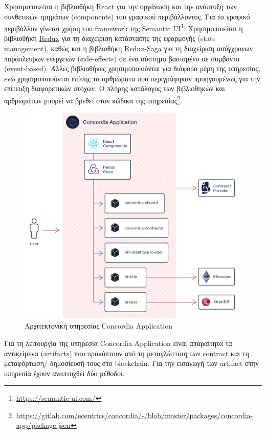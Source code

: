 Χρησιμοποιείται η βιβλιοθήκη \hyperref[subsection:4-2-2-1-react]{React} για την οργάνωση και την ανάπτυξη των συνθετικών τμημάτων (components) του γραφικού περιβάλλοντος. Για το γραφικό περιβάλλον γίνεται χρήση του framework της Semantic UI\footnote{\url{https://semantic-ui.com/}}. Χρησιμοποιείται η βιβλιοθήκη \hyperref[subsection:4-2-2-2-redux]{Redux} για τη διαχείριση κατάστασης της εφαρμογής (state management),
καθώς και η βιβλιοθήκη \hyperref[subsection:4-2-2-3-redux-saga]{Redux-Saga} για τη διαχείριση ασύγχρονων παράπλευρων ενεργειών (side-effects) σε ένα σύστημα βασισμένο σε συμβάντα (event-based). Άλλες βιβλιοθήκες χρησιμοποιούνται για διάφορα μέρη της υπηρεσίας, ενώ χρησιμοποιούνται επίσης τα αρθρώματα που περιγράφηκαν προηγουμένως για την επίτευξη διαφορετικών στόχων. Ο πλήρης κατάλογος των βιβλιοθηκών και αρθρωμάτων μπορεί να βρεθεί στον κώδικα της υπηρεσίας\footnote{\url{https://gitlab.com/ecentrics/concordia/-/blob/master/packages/concordia-app/package.json}}.

\vspace{\baselineskip}

\begin{figure}[H]
    \centering
    \includegraphics[width=.9\textwidth]{assets/figures/chapter-4/4.3.architecture-4.3.2.concordia-application-architecture}
    \caption{Αρχιτεκτονική υπηρεσίας Concordia Application}
    \label{figure:4-3-concordia-application-architecture}
\end{figure}

Για τη λειτουργία της υπηρεσία Concordia Application είναι απαραίτητα τα αντικείμενα (artifacts) που προκύπτουν από τη μεταγλώττιση των contract και τη μεταφόρτωση/ δημοσίευσή τους στο blockchain. Για την εισαγωγή των artifact στην υπηρεσία έχουν αναπτυχθεί δύο μέθοδοι.

